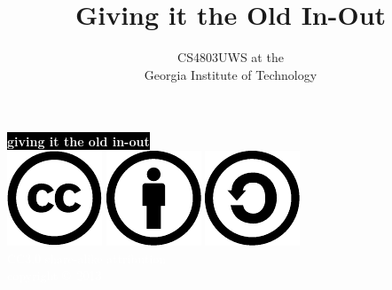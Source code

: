 \documentclass[mathserif,xcolor={dvipsnames,table}]{beamer}
\title{\textbf{Giving it the Old In-Out}}
\date{}
\author{CS4803UWS at the\\
Georgia Institute of Technology
}
\begin{document}
{
%
\begin{frame}[plain]
\textcolor{white}{
%
\colorbox{black}{\textbf{giving it the old in-out}}
}
\vspace{2.7in}
\\
\hfill\includegraphics[scale=.25]{images/cc-logo.pdf}
\includegraphics[scale=.25]{images/cc-new.pdf}
\includegraphics[scale=.25]{images/cc-share.pdf}
\textcolor{white}{
\\
\hfill \tiny{CC3.0 share-alike attribution}\\
}
\textcolor{white}{
\hfill \scriptsize{copyright \copyright\ 2013}\\
}
\end{frame}
}
\end{document}
